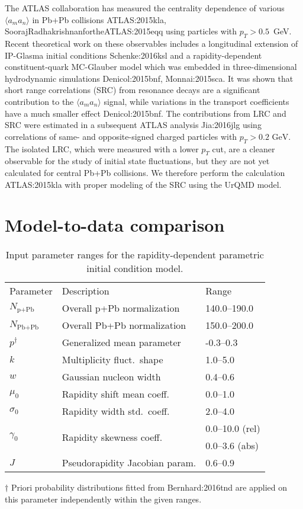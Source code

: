 The ATLAS collaboration has measured the centrality dependence of various $\langle a_m a_n\rangle$ in Pb+Pb collisions {ATLAS:2015kla, SoorajRadhakrishnanfortheATLAS:2015eqq} using particles with $p_T > 0.5$~GeV.
Recent theoretical work on these observables includes a longitudinal extension of IP-Glasma initial conditions {Schenke:2016ksl} and a rapidity-dependent constituent-quark MC-Glauber model which was embedded in three-dimensional hydrodynamic simulations {Denicol:2015bnf, Monnai:2015sca}.
It was shown that short range correlations (SRC) from resonance decays are a significant contribution to the $\langle a_m a_n\rangle$ signal, while variations in the transport coefficients have a much smaller effect {Denicol:2015bnf}.
The contributions from LRC and SRC were estimated in a subsequent ATLAS analysis {Jia:2016jlg} using correlations of same- and opposite-signed charged particles with $p_T > 0.2 \textrm{ GeV}$.
The isolated LRC, which were measured with a lower $p_T$ cut, are a cleaner observable for the study of initial state fluctuations, but they are not yet calculated for central Pb+Pb collisions.
We therefore perform the calculation {ATLAS:2015kla} with proper modeling of the SRC using the UrQMD model.

\section{Model-to-data comparison}

\begin{table}[t]
  \caption{Input parameter ranges for the rapidity-dependent parametric initial condition model.}

    \begin{tabular}{lll}
      Parameter & Description	& Range \\
      \paddedhline
      $N_{\textrm{p+Pb}}$    & Overall p+Pb normalization      & 140.0--190.0 \\
      $N_{\textrm{Pb+Pb}}$   & Overall Pb+Pb normalization     & 150.0--200.0  \\
      $p^\dagger$	                   & Generalized mean parameter      & -0.3--0.3  \\
      $k$	                   & Multiplicity fluct.\ shape      & 1.0--5.0  \\
      $w$	                   & Gaussian nucleon width     & 0.4--0.6  \\
      $\mu_0$                & Rapidity shift mean coeff.\     & 0.0--1.0  \\
      $\sigma_0$             & Rapidity width std.\ coeff.\    & 2.0--4.0  \\
      \multirow{2}{*}{$\gamma_0$}             & \multirow{2}{*}{Rapidity skewness coeff.\ }      & 0.0--10.0 (rel) \\
                  &        & 0.0--3.6 (abs)  \\
      $J$	                   & Pseudorapidity Jacobian param.  & 0.6--0.9
    \end{tabular}
   \raggedright{$\dagger$ Priori probability distributions fitted from {Bernhard:2016tnd} are applied on this parameter independently within the given ranges.}
  \label{tab:parameters}
\end{table}

